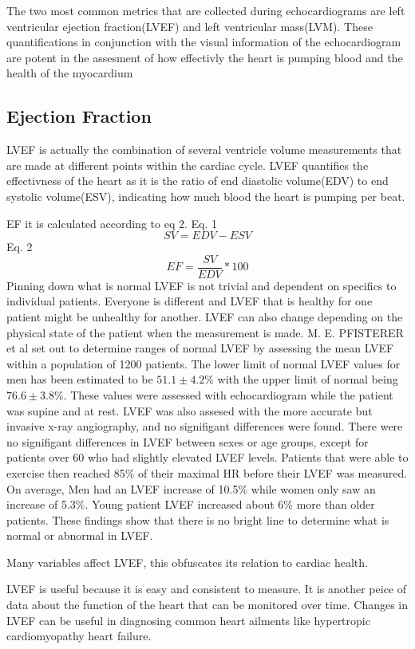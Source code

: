 \documentclass{article}
\begin{document}
The two most common metrics that are collected during echocardiograms are left ventricular ejection fraction(LVEF) and left ventricular mass(LVM).\cite{ase_chamber_quant_update}
These quantifications in conjunction with the visual information of the echocardiogram are potent in the assesment of how effectivly the heart is pumping blood and the health of the myocardium
\subsection{Ejection Fraction}
LVEF is actually the combination of several ventricle volume measurements that are made at different points within the cardiac cycle.
LVEF quantifies the effectivness of the heart as it is the ratio of end diastolic volume(EDV) to end systolic volume(ESV), indicating how much blood the heart is pumping per beat.

EF it is calculated according to eq 2.
Eq. 1
\[SV = EDV - ESV\]
Eq. 2
\[EF = \frac{SV}{EDV} * 100   \]  
Pinning down what is normal LVEF is not trivial and dependent on specifics to individual patients.
Everyone is different and LVEF that is healthy for one patient might be unhealthy for another.
LVEF can also change depending on the physical state of the patient when the measurement is made.
M. E. PFISTERER et al set out to determine ranges of normal LVEF by assessing the mean LVEF within a population of 1200 patients.
The lower limit of normal LVEF values for men has been estimated to be $ 51.1 \pm 4.2\%$ with the upper limit of normal being$ 76.6 \pm 3.8\%$.
These values were assessed with echocardiogram while the patient was supine and at rest.
LVEF was also assesed with the more accurate but invasive x-ray angiography, and no signifigant differences were found.
There were no signifigant differences in LVEF between sexes or age groups, except for patients over 60 who had slightly elevated LVEF levels.
Patients that were able to exercise then reached 85\% of their maximal HR before their LVEF was measured.
On average, Men had an LVEF increase of 10.5\% while women only saw an increase of 5.3\%.
Young patient LVEF increased about 6\% more than older patients\cite{norm_EF_values}.
These findings show that there is no bright line to determine what is normal or abnormal in LVEF.


Many variables affect LVEF, this obfuscates its relation to cardiac health. 

LVEF is useful because it is easy and consistent to measure. It is another peice of data about the function of the heart that can be monitored over time.
Changes in LVEF can be useful in diagnosing common heart ailments like hypertropic cardiomyopathy heart failure.
\end{document}
